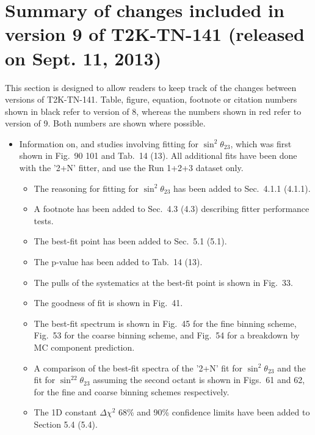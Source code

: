 
\section{Summary of changes included in version 9 of T2K-TN-141 (released on Sept. 11, 2013)}

This section is designed to allow readers to keep track of the changes between versions of T2K-TN-141.
Table, figure, equation, footnote or citation numbers shown in black refer to version of 8,
{\color{red}whereas the numbers shown in red refer to version of 9}.
Both numbers are shown where possible.

\begin{itemize}

\item
  Information on, and studies involving fitting for $\sin^2\theta_{23}$, which was first shown
  in Fig.\ 90 {\color{red}101} and Tab.\ 14 ({\color{red}13}).
  All additional fits have been done with the
  '2+N' fitter, and use the Run 1+2+3 dataset only.
  \begin{itemize}
  \item The reasoning for fitting for $\sin^2\theta_{23}$ has been added to Sec.\ 4.1.1 {\color{red}(4.1.1)}.
  \item A footnote has been added to Sec.\ 4.3 {\color{red}(4.3)} describing fitter performance tests.
  \item The best-fit point has been added to Sec.\ 5.1 {\color{red}(5.1)}.
  \item The p-value has been added to Tab.\ 14 {\color{red}(13)}.
  \item The pulls of the systematics at the best-fit point is shown in Fig.\ {\color{red}33}.
  \item The goodness of fit is shown in Fig.\ {\color{red}41}.
  \item The best-fit spectrum is shown in Fig.\ {\color{red}45} for the fine binning scheme,
    Fig.\ {\color{red}53} for the coarse binning scheme, and Fig.\ {\color{red}54} for a breakdown by MC component prediction.
  \item A comparison of the best-fit spectra of the '2+N' fit for $\sin^2\theta_{23}$
    and the fit for $\sin^22\theta_{23}$ assuming the second octant is shown in Figs.\ {\color{red}61} and {\color{red}62},
    for the fine and coarse binning schemes respectively.
  \item The 1D constant $\Delta \chi^2$ 68\% and 90\% confidence limits have been added to Section 5.4 {\color{red}(5.4)}.

\end{itemize}
\end{itemize}
